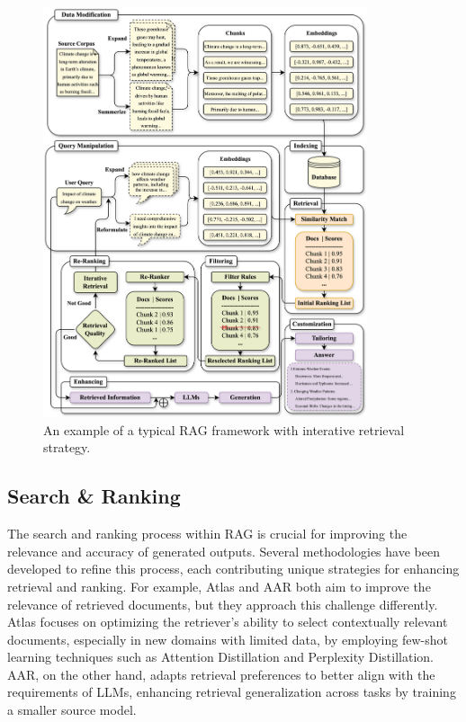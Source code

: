 \begin{figure}
	\includegraphics[width=0.85\textwidth]{Figures/RAG_framework.png}
	\caption{An example of a typical RAG framework with interative retrieval strategy.}
	\label{fig:rag_framework}
\end{figure}

\subsection{Search \& Ranking}
The search and ranking process within RAG is crucial for improving the relevance and accuracy of generated outputs. Several methodologies have been developed to refine this process, each contributing unique strategies for enhancing retrieval and ranking. For example, Atlas \cite{izacard2023atlas} and AAR \cite{yu2023augmentationadapted} both aim to improve the relevance of retrieved documents, but they approach this challenge differently. Atlas focuses on optimizing the retriever's ability to select contextually relevant documents, especially in new domains with limited data, by employing few-shot learning techniques such as Attention Distillation and Perplexity Distillation. AAR, on the other hand, adapts retrieval preferences to better align with the requirements of LLMs, enhancing retrieval generalization across tasks by training a smaller source model.


